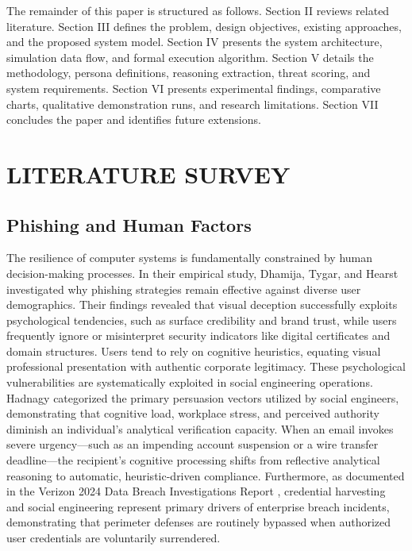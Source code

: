 \documentclass[conference,letterpaper]{IEEEtran}
\begin{document}
The remainder of this paper is structured as follows. Section II reviews related literature. Section III defines the problem, design objectives, existing approaches, and the proposed system model. Section IV presents the system architecture, simulation data flow, and formal execution algorithm. Section V details the methodology, persona definitions, reasoning extraction, threat scoring, and system requirements. Section VI presents experimental findings, comparative charts, qualitative demonstration runs, and research limitations. Section VII concludes the paper and identifies future extensions.

\section{LITERATURE SURVEY}

\subsection{Phishing and Human Factors}
The resilience of computer systems is fundamentally constrained by human decision-making processes. In their empirical study, Dhamija, Tygar, and Hearst \cite{dhamija2006} investigated why phishing strategies remain effective against diverse user demographics. Their findings revealed that visual deception successfully exploits psychological tendencies, such as surface credibility and brand trust, while users frequently ignore or misinterpret security indicators like digital certificates and domain structures. Users tend to rely on cognitive heuristics, equating visual professional presentation with authentic corporate legitimacy. These psychological vulnerabilities are systematically exploited in social engineering operations. Hadnagy \cite{hadnagy2018} categorized the primary persuasion vectors utilized by social engineers, demonstrating that cognitive load, workplace stress, and perceived authority diminish an individual's analytical verification capacity. When an email invokes severe urgency---such as an impending account suspension or a wire transfer deadline---the recipient's cognitive processing shifts from reflective analytical reasoning to automatic, heuristic-driven compliance. Furthermore, as documented in the Verizon 2024 Data Breach Investigations Report \cite{verizon2024}, credential harvesting and social engineering represent primary drivers of enterprise breach incidents, demonstrating that perimeter defenses are routinely bypassed when authorized user credentials are voluntarily surrendered.
\end{document}
